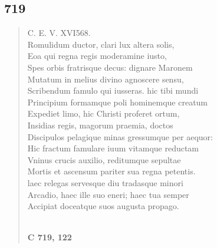 \documentclass[11pt, a4paper]{report}
\begin{document}
            \subsection*{719}
      \begin{verse}
      C. E. V. XVI568. \\ Romulidum ductor, clari lux altera solis, \\ Eoa qui regna regis moderamine iusto, \\ Spes orbis fratrisque decus: dignare Maronem \\ Mutatum in melius divino agnoscere sensu, \\ Scribendum famulo qui iusseras. hic tibi mundi \\ Principium formamque poli hominemque creatum \\ Expediet limo, hic Christi proferet ortum, \\ Insidias regis, magorum praemia, doctos \\ Discipulos pelagique minas gressumque per aequor: \\ Hic fractum famulare iuum vitamque reductam \\ Vninus crucis auxilio, reditumque sepultae \\ Mortis et ascensum pariter sua regna petentis. \\ laec relegas servesque diu tradasque minori \\ Arcadio, haec ille suo eneri; haec tua semper \\ Accipiat doceatque suos augusta propago. \\ 
        ﻿\pagebreak 
     \marginpar{[197]} \begin{center} \textbf{C 719, 122} \end{center}
      \end{verse}
  
\end{document}
